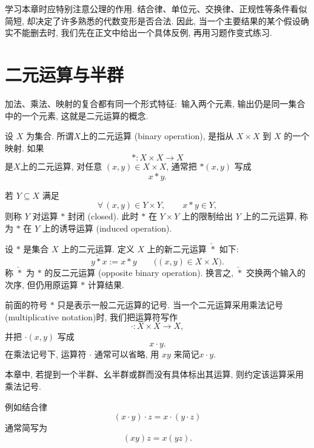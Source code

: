 \documentclass[usesamecnt, thmcnt=section, lang=cn, newtx, 10pt, scheme=chinese]{elegantbook}
\begin{document}
学习本章时应特别注意公理的作用. 结合律、单位元、交换律、正规性等条件看似简短, 却决定了许多熟悉的代数变形是否合法. 因此, 当一个主要结果的某个假设确实不能删去时, 我们先在正文中给出一个具体反例, 再用习题作变式练习.



\section{二元运算与半群}

加法、乘法、映射的复合都有同一个形式特征:~输入两个元素, 输出仍是同一集合中的一个元素, 这就是二元运算的概念.

\begin{definition}[二元运算]\label{def:alg-binary-operation}
设 $X$ 为集合. 所谓$X$上的{\color{blue}二元运算 (binary operation)}, 是指从 $X\times X$ 到 $X$ 的一个映射.
如果\[
 *:X\times X\longrightarrow X
\]
是$X$上的二元运算, 对任意 $(x,y)\in X\times X$, 通常把 $*(x,y)$ 写成
\[
 x*y.
\]

若 $Y\subseteq X$ 满足
\[
 \forall\,(x,y)\in Y\times Y,\qquad x*y\in Y,
\]
则称 $Y$ 对运算 $*$ {\color{blue}封闭 (closed)}. 此时 $*$ 在 $Y\times Y$ 上的限制给出 $Y$ 上的二元运算, 称为 $*$ 在 $Y$ 上的{\color{blue}诱导运算 (induced operation)}.
\end{definition}

\begin{definition}[反二元运算]\label{def:alg-opposite-binary-operation}
设 $*$ 是集合 $X$ 上的二元运算. 定义 $X$ 上的新二元运算 $\check{*}$ 如下:
\[
 y\mathbin{\check{*}}x:=x*y
 \qquad\bigl((x,y)\in X\times X\bigr).
\]
称 $\check{*}$ 为 $*$ 的{\color{blue}反二元运算 (opposite binary operation)}. 换言之, $\check{*}$ 交换两个输入的次序, 但仍用原运算 $*$ 计算结果.
\end{definition}

\begin{notation}[乘法记号]\label{not:alg-multiplicative-notation}
前面的符号 $*$ 只是表示一般二元运算的记号. 当一个二元运算采用{\color{blue}乘法记号 (multiplicative notation)}时, 我们把运算符写作
\[
 \cdot:X\times X\longrightarrow X,
\]
并把 $\cdot(x,y)$ 写成
\[
 x\cdot y.
\]
在乘法记号下, 运算符 $\cdot$ 通常可以省略, 用 $xy$ 来简记$
 x\cdot y$.

本章中, 若提到一个半群、幺半群或群而没有具体标出其运算, 则约定该运算采用乘法记号.

例如结合律
\[
 (x\cdot y)\cdot z=x\cdot(y\cdot z)
\]
通常简写为
\[
 (xy)z=x(yz).
\]


\end{notation}
\end{document}
